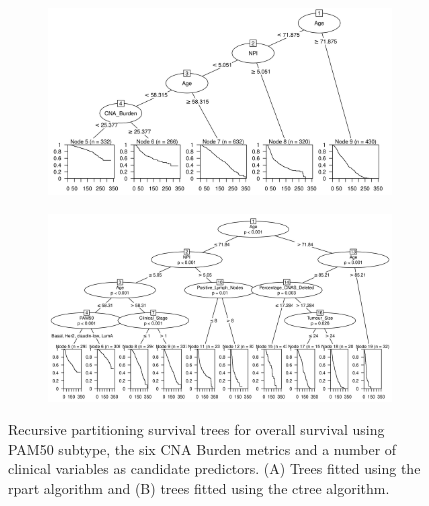 \begin{figure}[!htb]
\centering

\vspace{1cm}

\begin{subfigure}{\textwidth}
\subcaption{}
\includegraphics[width=1\textwidth]{../figures/Appendices/Appendix_B/Clin_PartyKit_Survival_Burden_OS_PAM50.png}
\end{subfigure}

\vspace{2cm}

\begin{subfigure}{\textwidth}
\subcaption{}
\includegraphics[width=1\textwidth]{../figures/Appendices/Appendix_B/Clin_Ctree_Survival_Burden_OS_PAM50.png}
\end{subfigure}

\vspace{1cm}

\caption[Recursive partitioning survival trees for overall survival using PAM50 subtype, the six CNA Burden metrics and a number of clinical variables as candidate predictors.]{Recursive partitioning survival trees for overall survival using PAM50 subtype, the six CNA Burden metrics and a number of clinical variables as candidate predictors. (A) Trees fitted using the rpart algorithm and (B) trees fitted using the ctree algorithm.}
\end{figure}

